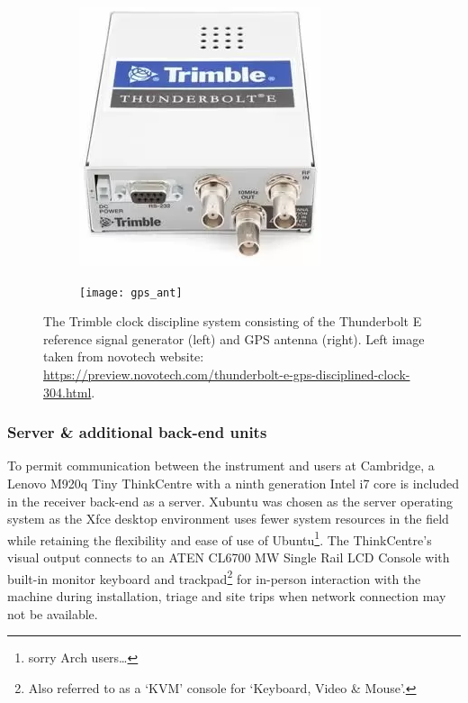 \begin{figure}
    \centering
    \centering
    \begin{subfigure}{.3\textwidth}
        \centering
        \includegraphics[width=\linewidth]{trimble}
    \end{subfigure}
    \hspace{.15\textwidth}
    \begin{subfigure}{.33\textwidth}
    \centering
        \texttt{[image: gps\_ant]}
    \end{subfigure}
    \caption{The Trimble clock discipline system consisting of the Thunderbolt E reference signal generator (left) and GPS antenna (right). Left image taken from novotech website: \url{https://preview.novotech.com/thunderbolt-e-gps-disciplined-clock-304.html}.}
    \label{fig:gps}
\end{figure}


\subsubsection{Server \& additional back-end units}
To permit communication between the instrument and users at Cambridge, a Lenovo M920q Tiny ThinkCentre with a ninth generation Intel i7 core is included in the receiver back-end as a server. Xubuntu was chosen as the server operating system as the Xfce desktop environment uses fewer system resources in the field while retaining the flexibility and ease of use of Ubuntu\footnote{sorry Arch users…}. The ThinkCentre’s visual output connects to an ATEN CL6700 MW Single Rail LCD Console with built-in monitor keyboard and trackpad\footnote{Also referred to as a ‘KVM’ console for ‘Keyboard, Video \& Mouse’.} for in-person interaction with the machine during installation, triage and site trips when network connection may not be available.

